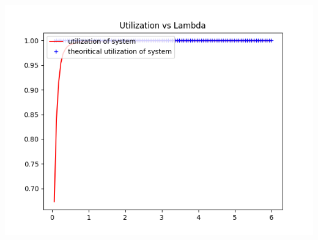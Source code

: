 \documentclass[11pt]{article}
\begin{document}
 \includegraphics{Utilization_L1000_K4_M2_U3}
 
\end{document}
